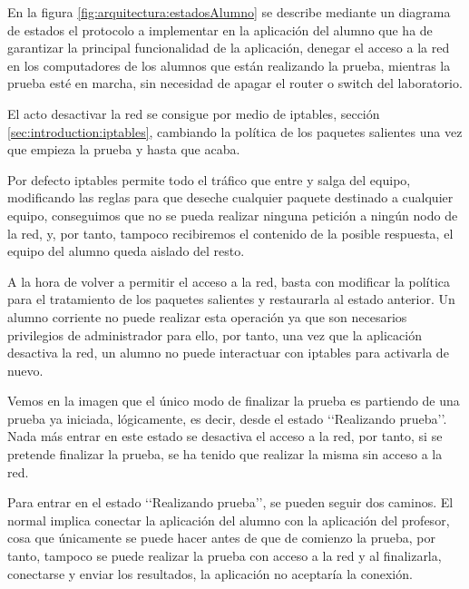 
En la figura \ref{fig:arquitectura:estadosAlumno} se describe mediante un diagrama de estados el protocolo a implementar en la aplicación del alumno que ha de garantizar la principal funcionalidad de la aplicación, denegar el acceso a la red en los computadores de los alumnos que están realizando la prueba, mientras la prueba esté en marcha, sin necesidad de apagar el router o switch del laboratorio. 
\newline

El acto desactivar la red se consigue por medio de iptables, sección \ref{sec:introduction:iptables}, cambiando la política de los paquetes salientes una vez que empieza la prueba y hasta que acaba.
\newline

Por defecto iptables permite todo el tráfico que entre y salga del equipo, modificando las reglas para que deseche cualquier paquete destinado a cualquier equipo, conseguimos que no se pueda realizar ninguna petición a ningún nodo de la red, y, por tanto, tampoco recibiremos el contenido de la posible respuesta, el equipo del alumno queda aislado del resto.
\newline

A la hora de volver a permitir el acceso a la red, basta con modificar la política para el tratamiento de los paquetes salientes y restaurarla al estado anterior. Un alumno corriente no puede realizar esta operación ya que son necesarios privilegios de administrador para ello, por tanto, una vez que la aplicación desactiva la red, un alumno no puede interactuar con iptables para activarla de nuevo.
\newline


Vemos en la imagen que el único modo de finalizar la prueba es partiendo de una prueba ya iniciada, lógicamente, es decir, desde el estado \lq\lq Realizando prueba\rq\rq. Nada más entrar en este estado se desactiva el acceso a la red, por tanto, si se pretende finalizar la prueba, se ha tenido que realizar la misma sin acceso a la red.
\newline

Para entrar en el estado \lq\lq Realizando prueba\rq\rq, se pueden seguir dos caminos. El normal implica conectar la aplicación del alumno con la aplicación del profesor, cosa que únicamente se puede hacer antes de que de comienzo la prueba, por tanto, tampoco se puede realizar la prueba con acceso a la red y al finalizarla, conectarse y enviar los resultados, la aplicación no aceptaría la conexión.
\newline

